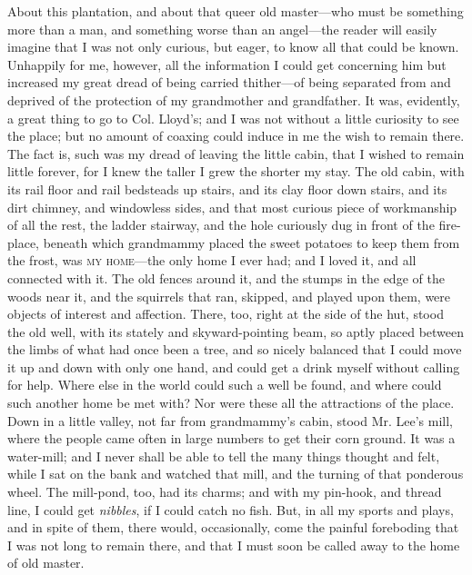 About this plantation, and about that queer old master---who must be
something more than a man, {\protect\hypertarget{44}{}{}}and something
worse than an angel---the reader will easily imagine that I was not only
curious, but eager, to know all that could be known. Unhappily for me,
however, all the information I could get concerning him but increased my
great dread of being carried thither---of being separated from and
deprived of the protection of my grandmother and grandfather. It was,
evidently, a great thing to go to Col. Lloyd's; and I was not without a
little curiosity to see the place; but no amount of coaxing could induce
in me the wish to remain there. The fact is, such was my dread of
leaving the little cabin, that I wished to remain little forever, for I
knew the taller I grew the shorter my stay. The old cabin, with its rail
floor and rail bedsteads up stairs, and its clay floor down stairs, and
its dirt chimney, and windowless sides, and that most curious piece of
workmanship of all the rest, the ladder stairway, and the hole curiously
dug in front of the fire-place, beneath which grandmammy placed the
sweet potatoes to keep them from the frost, was \textsc{my home}---the
only home I ever had; and I loved it, and all connected with it. The old
fences around it, and the stumps in the edge of the woods near it, and
the squirrels that ran, skipped, and played upon them, were objects of
interest and affection. There, too, right at the side of the hut, stood
the old well, with its stately and skyward-pointing beam, so aptly
placed between the limbs of what had once been a tree, and so nicely
balanced that I could move it up and down with only one hand, and could
get a drink myself without calling for help. Where else in the world
could such a well be found, and where could
{\protect\hypertarget{45}{}{}}such another home be met with? Nor were
these all the attractions of the place. Down in a little valley, not far
from grandmammy's cabin, stood Mr. Lee's mill, where the people came
often in large numbers to get their corn ground. It was a water-mill;
and I never shall be able to tell the many things thought and felt,
while I sat on the bank and watched that mill, and the turning of that
ponderous wheel. The mill-pond, too, had its charms; and with my
pin-hook, and thread line, I could get \emph{nibbles}, if I could catch
no fish. But, in all my sports and plays, and in spite of them, there
would, occasionally, come the painful foreboding that I was not long to
remain there, and that I must soon be called away to the home of old
master.

